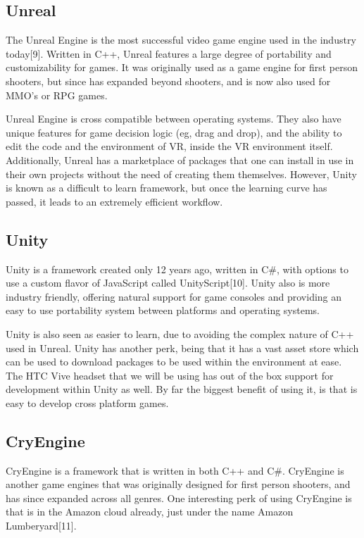 \documentclass[onecolumn, draftclsnofoot,10pt, compsoc]{IEEEtran}
\begin{document}
    \subsection{Unreal}
        The Unreal Engine is the most successful video game engine used in the industry today[9]. Written in C++, Unreal features a large degree of portability and customizability for games. It was originally used as a game engine for first person shooters, but since has expanded beyond shooters, and is now also used for MMO’s or RPG games.

        Unreal Engine is cross compatible between operating systems. They also have unique features for game decision logic (eg, drag and drop), and the ability to edit the code and the environment of VR, inside the VR environment itself. Additionally, Unreal has a marketplace of packages that one can install in use in their own projects without the need of creating them themselves. However, Unity is known as a difficult to learn framework, but once the learning curve has passed, it leads to an extremely efficient workflow. 

    \subsection{Unity}
        Unity is a framework created only 12 years ago, written in C\#, with options to use a custom flavor of JavaScript called UnityScript[10]. Unity also is more industry friendly, offering natural support for game consoles and providing an easy to use portability system between platforms and operating systems.

        Unity is also seen as easier to learn, due to avoiding the complex nature of C++ used in Unreal. Unity has another perk, being that it has a vast asset store which can be used to download packages to be used within the environment at ease. The HTC Vive headset that we will be using has out of the box support for development within Unity as well. By far the biggest benefit of using it, is that is easy to develop cross platform games. 


    \subsection{CryEngine}
        CryEngine is a framework that is written in both C++ and C\#. CryEngine is another game engines that was originally designed for first person shooters, and has since expanded across all genres. One interesting perk of using CryEngine is that is in the Amazon cloud already, just under the name Amazon Lumberyard[11].
\end{document}
